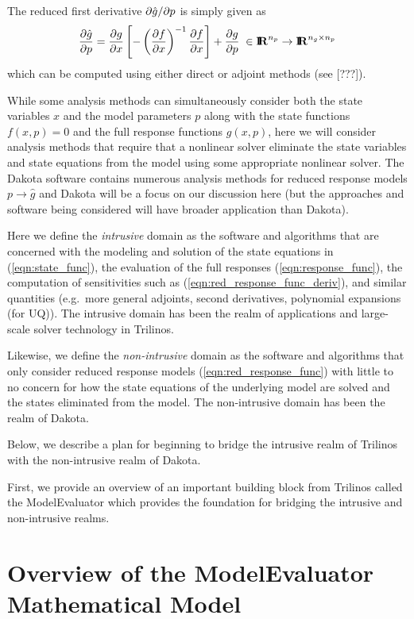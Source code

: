 \documentclass[pdf,ps2pdf,11pt]{SANDreport}
\begin{document}
The reduced first derivative $\partial \hat{g} / \partial p$ is simply given as
%
\begin{equation}
\displaystyle{\frac{\partial \hat{g}}{\partial p}} = \displaystyle{\frac{\partial g}{\partial x}} \left[ - \left(\displaystyle{\frac{\partial f}{\partial x}}\right)^{-1} \displaystyle{\frac{\partial f}{\partial x}} \right] + \displaystyle{\frac{\partial g}{\partial p}}
\; \in \mbox{\textbf{I}}\hspace{-0.6ex}\mbox{\textbf{R}}^{n_p} \rightarrow \mbox{\textbf{I}}\hspace{-0.6ex}\mbox{\textbf{R}}^{n_g \times n_p}
\label{eqn:red_response_func_deriv}
\end{equation}
%
which can be computed using either direct or adjoint methods (see [???]).

While some analysis methods can simultaneously consider both the state
variables $x$ and the model parameters $p$ along with the state functions
$f(x,p)=0$ and the full response functions $g(x,p)$, here we will consider
analysis methods that require that a nonlinear solver eliminate the state
variables and state equations from the model using some appropriate nonlinear
solver.  The Dakota software contains numerous analysis methods for reduced
response models $p {}\rightarrow {}\hat{g}$ and Dakota will be a focus on our
discussion here (but the approaches and software being considered will have
broader application than Dakota).

Here we define the {}\textit{intrusive} domain as the software and algorithms
that are concerned with the modeling and solution of the state equations in
(\ref{eqn:state_func}), the evaluation of the full responses
(\ref{eqn:response_func}), the computation of sensitivities such as
(\ref{eqn:red_response_func_deriv}), and similar quantities (e.g.\ more
general adjoints, second derivatives, polynomial expansions (for UQ)).  The
intrusive domain has been the realm of applications and large-scale solver
technology in Trilinos.

Likewise, we define the {}\textit{non-intrusive} domain as the software and
algorithms that only consider reduced response models
(\ref{eqn:red_response_func}) with little to no concern for how the state
equations of the underlying model are solved and the states eliminated from
the model.  The non-intrusive domain has been the realm of Dakota.

Below, we describe a plan for beginning to bridge the intrusive realm of
Trilinos with the non-intrusive realm of Dakota.

First, we provide an overview of an important building block from Trilinos
called the ModelEvaluator which provides the foundation for bridging the
intrusive and non-intrusive realms.

%
\section{Overview of the ModelEvaluator Mathematical Model}
%
\end{document}
